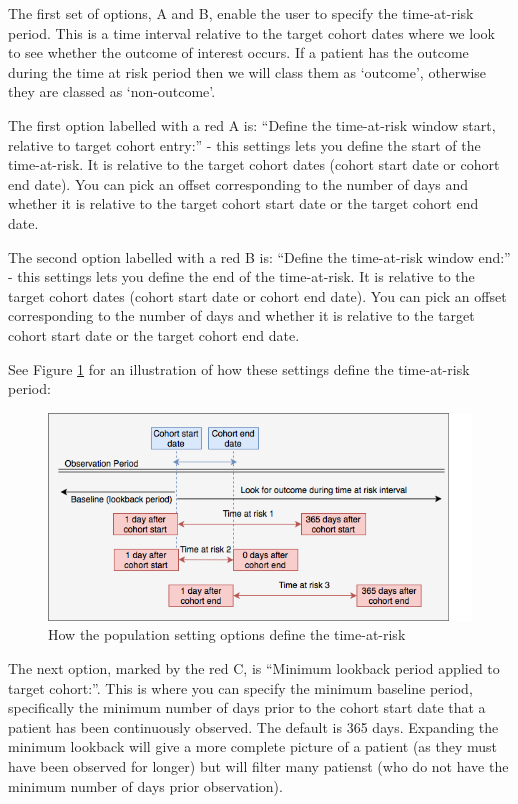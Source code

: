 \documentclass[11pt]{book}
\theoremstyle{definition}
\theoremstyle{definition}
\theoremstyle{definition}
\theoremstyle{remark}
\begin{document}
The first set of options, A and B, enable the user to specify the time-at-risk period. This is a time interval relative to the target cohort dates where we look to see whether the outcome of interest occurs. If a patient has the outcome during the time at risk period then we will class them as `outcome', otherwise they are classed as `non-outcome'.

The first option labelled with a red A is: ``Define the time-at-risk window start, relative to target cohort entry:'' - this settings lets you define the start of the time-at-risk. It is relative to the target cohort dates (cohort start date or cohort end date). You can pick an offset corresponding to the number of days and whether it is relative to the target cohort start date or the target cohort end date.

The second option labelled with a red B is: ``Define the time-at-risk window end:'' - this settings lets you define the end of the time-at-risk. It is relative to the target cohort dates (cohort start date or cohort end date). You can pick an offset corresponding to the number of days and whether it is relative to the target cohort start date or the target cohort end date.

See Figure \ref{fig:figureAS20} for an illustration of how these settings define the time-at-risk period:

\begin{figure}
\includegraphics[width=1\linewidth]{images/PatientLevelPrediction/atlasImplementation/analysis_population_plot} \caption{How the population setting options define the time-at-risk}\label{fig:figureAS20}
\end{figure}

The next option, marked by the red C, is ``Minimum lookback period applied to target cohort:''. This is where you can specify the minimum baseline period, specifically the minimum number of days prior to the cohort start date that a patient has been continuously observed. The default is 365 days. Expanding the minimum lookback will give a more complete picture of a patient (as they must have been observed for longer) but will filter many patienst (who do not have the minimum number of days prior observation).
\end{document}
